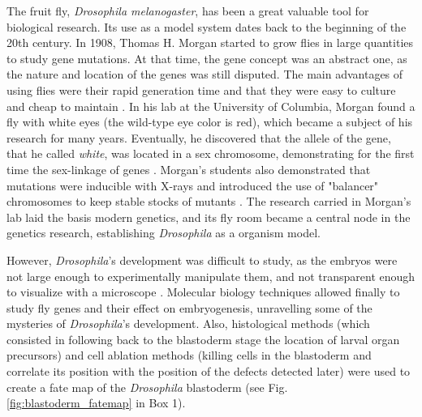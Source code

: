 The fruit fly, \textit{Drosophila melanogaster}, has been a great valuable tool for biological research.
Its use as a model system dates back to the beginning of the 20th century.
In 1908, Thomas H. Morgan started to grow flies in large quantities to study gene mutations. At that time, the gene concept was an abstract one, as the nature and location of the genes was still disputed.
%
The main advantages of using flies were their rapid generation time and that they were easy to culture and cheap to maintain \citep{Arias2008}.
%
In his lab at the University of Columbia, Morgan found a fly with white eyes (the wild-type eye color is red), which became a subject of his research for many years.
Eventually, he discovered that the allele of the gene, that he called \textit{white}, was located in a sex chromosome, demonstrating for the first time the sex-linkage of genes \citep{Morgan1919}.
%
Morgan's students also demonstrated that mutations were inducible with X-rays and introduced the use of "balancer" chromosomes to keep stable stocks of mutants \citep{Arias2008}.
%
The research carried in Morgan's lab laid the basis modern genetics, and its fly room became a central node in the genetics research, establishing \textit{Drosophila} as a organism model.

However, \textit{Drosophila}'s development was difficult to study, as the embryos were not large enough to experimentally manipulate them, and not transparent enough to visualize with a microscope \citep{Gilbert2014}.
Molecular biology techniques allowed finally to study fly genes and their effect on embryogenesis, unravelling some of the mysteries of \textit{Drosophila}'s development.
Also, histological methods (which consisted in following back to the blastoderm stage the location of larval organ precursors) and cell ablation methods (killing cells in the blastoderm and correlate its position with the position of the defects detected later) were used to create a fate map of the \textit{Drosophila} blastoderm \citep{Campos-Ortega1985} (see Fig. \ref{fig:blastoderm_fatemap} in Box 1).

%

